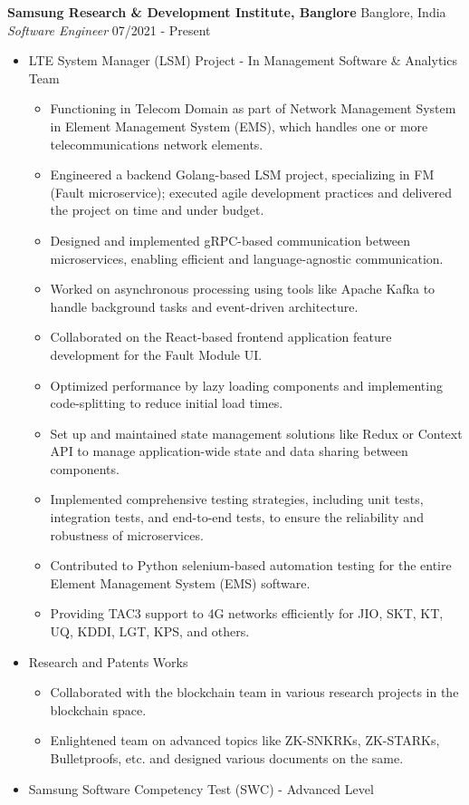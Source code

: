 \documentclass{article}
\begin{document}
\noindent \normalsize \textbf{Samsung Research \& Development Institute, Banglore} \hfill Banglore, India \\
\textit{Software Engineer} \hfill 07/2021 - Present
\begin{itemize}[noitemsep,nolistsep,leftmargin=*]
    \item {\normalsize {LTE System Manager (LSM) Project - In Management Software \& Analytics Team }
        \begin{itemize}
            \item Functioning in Telecom Domain as part of Network Management System in Element Management System (EMS), which handles one or more telecommunications network elements.
            \item Engineered a backend Golang-based LSM project, specializing in FM (Fault microservice); executed agile development practices and delivered the project on time and under budget.
            \item Designed and implemented gRPC-based communication between microservices, enabling efficient and language-agnostic communication.
            \item Worked on asynchronous processing using tools like Apache Kafka to handle background tasks and event-driven architecture.
            \item Collaborated on the React-based frontend application feature development for the Fault Module UI.
            \item Optimized performance by lazy loading components and implementing code-splitting to reduce initial load times.
            \item Set up and maintained state management solutions like Redux or Context API to manage application-wide state and data sharing between components.
            \item Implemented comprehensive testing strategies, including unit tests, integration tests, and end-to-end tests, to ensure the reliability and robustness of microservices.
            \item Contributed to Python selenium-based automation testing for the entire Element Management System (EMS) software.
            \item Providing TAC3 support to 4G networks efficiently for JIO, SKT, KT, UQ, KDDI, LGT, KPS, and others.
        \end{itemize}
    }
    \item {\normalsize {Research and Patents Works}
        \begin{itemize}
            \item Collaborated with the blockchain team in various research projects in the blockchain space.
            \item Enlightened team on advanced topics like ZK-SNKRKs, ZK-STARKs, Bulletproofs, etc. and designed various documents on the same.
        \end{itemize}
    }
    \item {\normalsize {Samsung Software Competency Test (SWC) - Advanced Level}}
\end{itemize}
\end{document}
